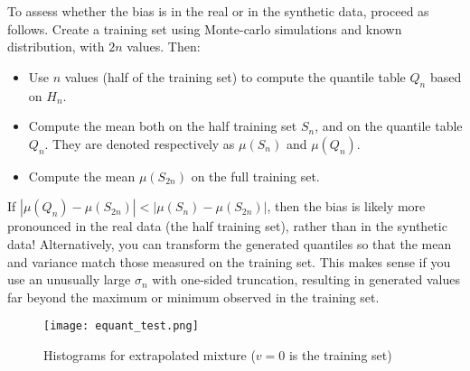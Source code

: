 \documentclass[oneside,10pt]{book}
\begin{document}
To assess whether the bias is in the real or in the synthetic data, proceed as follows. Create a training set using 
 Monte-carlo simulations and known distribution, with $2n$ values. Then:\vspace{1ex}
\begin{itemize}
\item Use $n$ values (half of the training set) to compute the quantile table $Q_n$ 
 based on $H_n$.
\item Compute the mean both on the half training set $S_n$, and on the quantile table $Q_n$. They  are denoted respectively 
 as $\mu(S_n)$ and $\mu(Q_n)$.
\item Compute the mean $\mu(S_{2n})$ on the full training set.
\end{itemize}
\vspace{1ex}
If $|\mu(Q_n) - \mu(S_{2n})| < |\mu(S_n) - \mu(S_{2n})|$, then the bias is likely more pronounced in the real data (the half training set), rather than in the synthetic data! Alternatively, you can transform the generated quantiles so that the mean and variance match those measured on the training set. This
 makes sense if you use an unusually large $\sigma_n$ with 
 one-sided truncation, resulting in generated values far beyond the maximum or minimum observed in the training set.
 


\begin{figure}[H]
\centering
\texttt{[image: equant\_test.png]}  
\caption{Histograms for extrapolated mixture ($v=0$ is the training set)}
\label{tssaqws09}
\end{figure}
\end{document}
